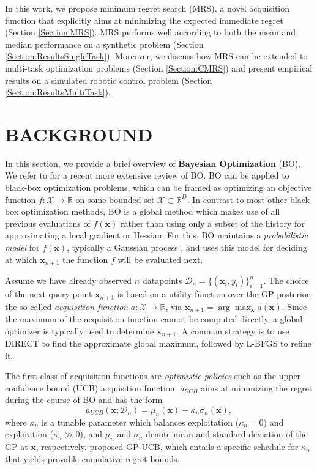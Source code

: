 \documentclass[10pt,letterpaper]{article} %
\begin{document}
In this work, we propose minimum regret search (MRS), a novel acquisition
function that explicitly aims at minimizing the expected immediate regret
(Section \ref{Section:MRS}). MRS performs well according to both the mean and
median performance on a synthetic problem (Section
\ref{Section:ResultsSingleTask}). Moreover, we discuss how MRS can be extended
to multi-task optimization problems (Section \ref{Section:CMRS}) and present
empirical results on a simulated robotic control problem (Section
\ref{Section:ResultsMultiTask}).


\section{BACKGROUND} \label{Section:Background}

In this section, we provide a brief overview of
\textbf{Bayesian Optimization} (BO). We refer to \citet{shahriari_taking_2016} for a recent more
extensive review of BO. BO can be applied to black-box optimization
problems, which can be framed as optimizing an objective function $f:
\mathcal{X} \to \mathbb{R}$ on some bounded set $\mathcal X \subset
\mathbb{R}^D$. In contrast to most  other black-box optimization methods, BO is
a global method which makes use of all previous evaluations of $f(\mathbf{x})$
rather than using only a subset of the history for approximating a local
gradient or Hessian. For this, BO maintains a \emph{probabilistic model} for
$f(\mathbf{x})$, typically a Gaussian process \citep[GP,][]{rasmussen_gaussian_2006}, and uses this model for deciding
at which $\mathbf{x}_{n+1}$ the function $f$ will be evaluated next.

Assume we have already observed $n$ datapoints $\mathcal{D}_n=\{(\mathbf{x}_i,
y_i)\}_{i=1}^n$. The choice of the next query point $\mathbf{x}_{n+1}$ is based
on a utility function over the GP posterior, the so-called \emph{acquisition
function} $a: \mathcal X \to \mathbb{R}$, via $\mathbf{x}_{n+1}=
\arg\max_\mathbf{x} a(\mathbf{x})$. Since the maximum of the acquisition
function cannot be computed directly, a global optimizer is typically
used to determine $\mathbf{x}_{n+1}$. A common strategy
is to use
DIRECT \citep{jones_lipschitzian_1993} to find the approximate global maximum,
followed by L-BFGS \citep{byrd_limited-memory_1995} to refine it.

The first class of acquisition functions are \emph{optimistic policies} such as
the upper confidence bound (UCB) acquisition function. $a_{UCB}$ aims at minimizing the regret during the course of BO and has the form $$a_{UCB}(\mathbf{x};
\mathcal{D}_n) = \mu_{n}(\mathbf{x}) + \kappa_n \sigma_{n}(\mathbf{x}),$$ where
$\kappa_n$ is a tunable parameter which balances exploitation ($\kappa_n = 0$) and
exploration ($\kappa_n \gg 0$), and $\mu_{n}$ and $\sigma_{n}$ denote mean and
standard deviation of the GP at $\mathbf{x}$, respectively.
\citet{srinivas_gaussian_2010} proposed GP-UCB, which entails a specific schedule for $\kappa_n$ that yields provable cumulative regret bounds.
\end{document}
